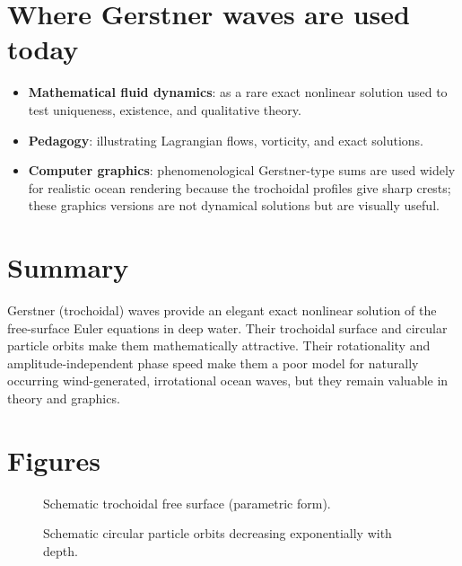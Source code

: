 \documentclass[11pt,letterpaper]{article}
\begin{document}
\section{Where Gerstner waves are used today}
\begin{itemize}
\item \textbf{Mathematical fluid dynamics}: as a rare exact nonlinear solution used to test uniqueness, existence, and qualitative theory.
\item \textbf{Pedagogy}: illustrating Lagrangian flows, vorticity, and exact solutions.
\item \textbf{Computer graphics}: phenomenological Gerstner-type sums are used widely for realistic ocean rendering because the trochoidal profiles give sharp crests; these graphics versions are not dynamical solutions but are visually useful.
\end{itemize}

\section{Summary}
Gerstner (trochoidal) waves provide an elegant exact nonlinear solution of the free-surface Euler equations in deep water. Their trochoidal surface and circular particle orbits make them mathematically attractive. Their rotationality and amplitude-independent phase speed make them a poor model for naturally occurring wind-generated, irrotational ocean waves, but they remain valuable in theory and graphics.

\section*{Figures}
\begin{figure}[h!]
\centering
{}
\caption{Schematic trochoidal free surface (parametric form).}
\end{figure}

\begin{figure}[h!]
\centering
{}
\caption{Schematic circular particle orbits decreasing exponentially with depth.}
\end{figure}
\end{document}
